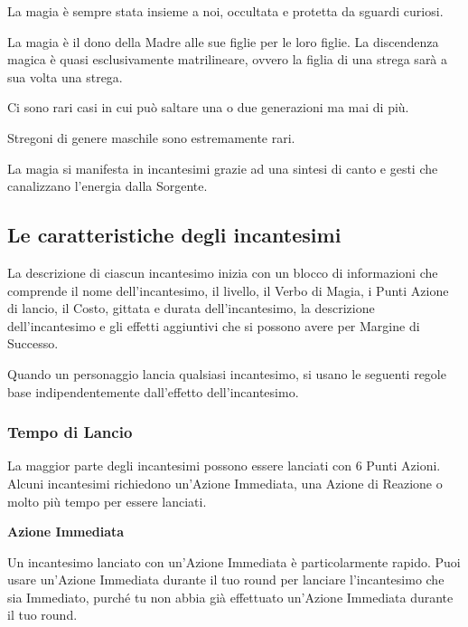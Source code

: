 \documentclass[12pt,a4paper,twoside,openany]{book}
\begin{document}
\begin{multicols}{2}
	


La magia è sempre stata insieme a noi, occultata e protetta da sguardi curiosi.

La magia è il dono della Madre alle sue figlie per le loro figlie.
La discendenza magica è quasi esclusivamente matrilineare, ovvero la figlia di una strega sarà a sua volta una strega.

Ci sono rari casi in cui può saltare una o due generazioni ma mai di più.

Stregoni di genere maschile sono estremamente rari.

La magia si manifesta in incantesimi grazie ad una sintesi di canto e gesti che canalizzano l'energia dalla Sorgente.

\subsection{Le caratteristiche degli incantesimi}\label{caratteristicheincantesimi}

La descrizione di ciascun incantesimo inizia con un blocco di informazioni che comprende il nome dell'incantesimo, il livello, il Verbo di Magia, i Punti Azione di lancio, il Costo, gittata e durata dell'incantesimo, la descrizione dell'incantesimo e gli effetti aggiuntivi che si possono avere per Margine di Successo.

Quando un personaggio lancia qualsiasi incantesimo, si usano le seguenti regole base indipendentemente dall'effetto dell'incantesimo.

\subsubsection{Tempo di Lancio}\label{magietempodilancio}

La maggior parte degli incantesimi possono essere lanciati con 6 Punti Azioni. Alcuni incantesimi richiedono un'Azione Immediata, una Azione di Reazione o molto più tempo per essere lanciati.

\textbf{Azione Immediata}

Un incantesimo lanciato con un'Azione Immediata è particolarmente rapido. Puoi usare un'Azione Immediata durante il tuo round per lanciare l'incantesimo che sia Immediato, purché tu non abbia già effettuato un'Azione Immediata durante il tuo round.


\end{multicols}
\end{document}

